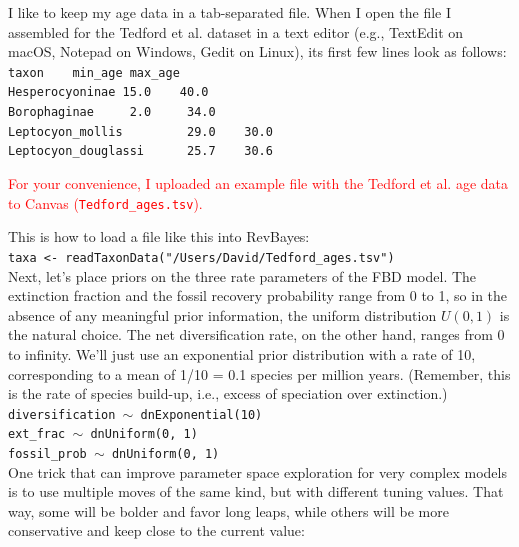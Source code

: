 \documentclass[12pt]{article}
\begin{document}
\noindent I like to keep my age data in a tab-separated file. When I open the file I assembled for the Tedford et al. dataset in a text editor (e.g., TextEdit on macOS, Notepad on Windows, Gedit on Linux), its first few lines look as follows: \\

\indent \texttt{taxon\ \ \ \ min\_age max\_age} \\
\indent \texttt{Hesperocyoninae 15.0\ \ \ \ 40.0} \\
\indent \texttt{Borophaginae	\ \ \ \ 2.0\ \ \ \ \	34.0} \\
\indent \texttt{Leptocyon\_mollis\ \ \ \ \ \ \ \ \ 29.0\ \ \ \ 30.0} \\
\indent \texttt{Leptocyon\_douglassi\ \ \ \ \,\ 25.7\ \ \ \ 30.6} \\

\begin{center}
\textcolor{red}{For your convenience, I uploaded an example file with the Tedford et al. age data to Canvas (\texttt{Tedford\_ages.tsv}).}
\end{center}

\noindent This is how to load a file like this into RevBayes: \\

\indent \texttt{taxa <- readTaxonData("/Users/David/Tedford\_ages.tsv")} \\

\noindent Next, let's place priors on the three rate parameters of the FBD model. The extinction fraction and the fossil recovery probability range from 0 to 1, so in the absence of any meaningful prior information, the uniform distribution $U(0,1)$ is the natural choice. The net diversification rate, on the other hand, ranges from 0 to infinity. We'll just use an exponential prior distribution with a rate of 10, corresponding to a mean of 1/10 = 0.1 species per million years. (Remember, this is the rate of species build-up, i.e., excess of speciation over extinction.) \\

\indent \texttt{diversification {\footnotesize $\sim$} dnExponential(10)} \\
\indent \texttt{ext\_frac {\footnotesize $\sim$} dnUniform(0, 1)} \\
\indent \texttt{fossil\_prob {\footnotesize $\sim$} dnUniform(0, 1)} \\

\noindent One trick that can improve parameter space exploration for very complex models is to use multiple moves of the same kind, but with different tuning values. That way, some will be bolder and favor long leaps, while others will be more conservative and keep close to the current value: \\
\end{document}
